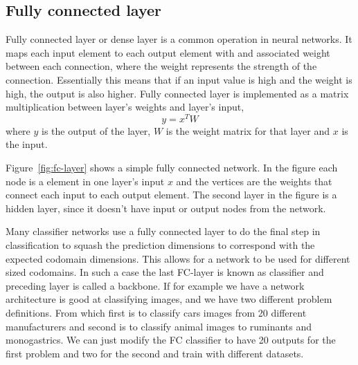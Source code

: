 \documentclass[12pt,a4paper,english
]{tunithesis}
\begin{document}
\subsection{Fully connected layer}
Fully connected layer or dense layer is a common operation in neural networks. It maps each input element to each output element with and associated weight between each connection, where the weight represents the strength of the connection. Essentially this means that if an input value is high and the weight is high, the output is also higher.
Fully connected layer is implemented as a matrix multiplication between layer's weights and layer's input,
\begin{equation}
y = x^{T} W
\end{equation}
where $y$ is the output of the layer, $W$ is the weight matrix for that layer and $x$ is the input.

Figure~\ref{fig:fc-layer} shows a simple fully connected network. In the figure each node is a element in one layer's input $x$ and the vertices are the weights that connect each input to each output element. The second layer in the figure is a hidden layer, since it doesn't have input or output nodes from the network.

Many classifier networks use a fully connected layer to do the final step in classification to squash the prediction dimensions to correspond with the expected codomain dimensions. This allows for a network to be used for different sized codomains. In such a case the last FC-layer is known as classifier and preceding layer is called a backbone. If for example we have a network architecture is good at classifying images, and we have two different problem definitions. From which first is to classify cars images from 20 different manufacturers and second is to classify animal images to ruminants and monogastrics. We can just modify the FC classifier to have 20 outputs for the first problem and two for the second and train with different datasets.
\end{document}
